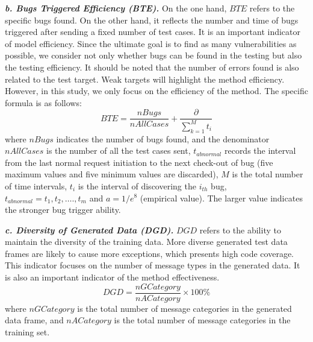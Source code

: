 \quad \textit{\textbf{b. Bugs Triggered Efficiency (BTE).}} On the one hand, $BTE$ refers to the specific bugs found. On the other hand, it reflects the number and time of bugs triggered after sending a fixed number of test cases. It is an important indicator of model efficiency. Since the ultimate goal is to find as many vulnerabilities as possible, we consider not only whether bugs can be found in the testing but also the testing efficiency.  It should be noted that the number of errors found is also related to the test target. Weak targets will highlight the method efficiency. However, in this study, we only focus on the efficiency of the method. The specific formula is as follows:
\begin{equation}
BTE = \frac{{nBugs}}{{nAllCases}} + \frac{\partial }{{\sum\limits_{k = 1}^M {{t_i}} }}
\end{equation}
where $nBugs$ indicates the number of bugs found, and the denominator $nAllCases$ is the number of all the test cases sent, $t_{abnormal}$ records the interval from the last normal request initiation to the next check-out of bug (five maximum values and five minimum values are discarded), $M$ is the total number of time intervals, $t_i$ is the interval of discovering the $i_{th}$ bug, $t_{abnormal}= {t_1, t_2, …., t_m}$ and $a = 1/e^8$ (empirical value). The larger value indicates the stronger bug trigger ability.

\quad \textit{\textbf{c. Diversity of Generated Data (DGD).}} $DGD$ refers to the ability to maintain the diversity of the training data. More diverse generated test data frames are likely to cause more exceptions, which presents high code coverage. This indicator focuses on the number of message types in the generated data. It is also an important indicator of the method effectiveness.
\begin{equation}
DGD = \frac{{nGCategory}}{{nACategory}} \times 100\% 
\end{equation}
where $nGCategory$ is the total number of message categories in the generated data frame, and $nACategory$ is the total number of message categories in the training set.

